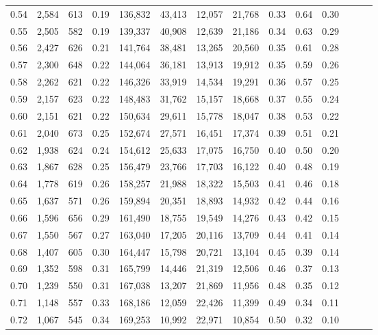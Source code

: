 \begin{tabular}{rrrrrrrrrrrrrr}
0.54 &  2,584 &  613 &  0.19 &  136,832 &   43,413 &  12,057 &  21,768 &  0.33 &  0.64 &      0.30 \\
0.55 &  2,505 &  582 &  0.19 &  139,337 &   40,908 &  12,639 &  21,186 &  0.34 &  0.63 &      0.29 \\
0.56 &  2,427 &  626 &  0.21 &  141,764 &   38,481 &  13,265 &  20,560 &  0.35 &  0.61 &      0.28 \\
0.57 &  2,300 &  648 &  0.22 &  144,064 &   36,181 &  13,913 &  19,912 &  0.35 &  0.59 &      0.26 \\
0.58 &  2,262 &  621 &  0.22 &  146,326 &   33,919 &  14,534 &  19,291 &  0.36 &  0.57 &      0.25 \\
0.59 &  2,157 &  623 &  0.22 &  148,483 &   31,762 &  15,157 &  18,668 &  0.37 &  0.55 &      0.24 \\
0.60 &  2,151 &  621 &  0.22 &  150,634 &   29,611 &  15,778 &  18,047 &  0.38 &  0.53 &      0.22 \\
0.61 &  2,040 &  673 &  0.25 &  152,674 &   27,571 &  16,451 &  17,374 &  0.39 &  0.51 &      0.21 \\
0.62 &  1,938 &  624 &  0.24 &  154,612 &   25,633 &  17,075 &  16,750 &  0.40 &  0.50 &      0.20 \\
0.63 &  1,867 &  628 &  0.25 &  156,479 &   23,766 &  17,703 &  16,122 &  0.40 &  0.48 &      0.19 \\
0.64 &  1,778 &  619 &  0.26 &  158,257 &   21,988 &  18,322 &  15,503 &  0.41 &  0.46 &      0.18 \\
0.65 &  1,637 &  571 &  0.26 &  159,894 &   20,351 &  18,893 &  14,932 &  0.42 &  0.44 &      0.16 \\
0.66 &  1,596 &  656 &  0.29 &  161,490 &   18,755 &  19,549 &  14,276 &  0.43 &  0.42 &      0.15 \\
0.67 &  1,550 &  567 &  0.27 &  163,040 &   17,205 &  20,116 &  13,709 &  0.44 &  0.41 &      0.14 \\
0.68 &  1,407 &  605 &  0.30 &  164,447 &   15,798 &  20,721 &  13,104 &  0.45 &  0.39 &      0.14 \\
0.69 &  1,352 &  598 &  0.31 &  165,799 &   14,446 &  21,319 &  12,506 &  0.46 &  0.37 &      0.13 \\
0.70 &  1,239 &  550 &  0.31 &  167,038 &   13,207 &  21,869 &  11,956 &  0.48 &  0.35 &      0.12 \\
0.71 &  1,148 &  557 &  0.33 &  168,186 &   12,059 &  22,426 &  11,399 &  0.49 &  0.34 &      0.11 \\
0.72 &  1,067 &  545 &  0.34 &  169,253 &   10,992 &  22,971 &  10,854 &  0.50 &  0.32 &      0.10 \\

\end{tabular}

